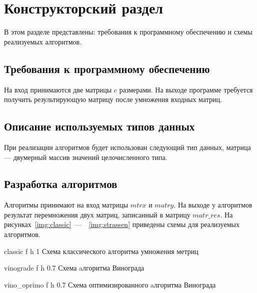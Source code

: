\chapter{Конструкторский раздел}

В этом разделе представлены: требования к программному обеспечению и схемы реализуемых алгоритмов.


\section{Требования к программному обеспечению}

На вход принимаются две матрицы c размерами.
На выходе программе требуется получить результирующую матрицу после умножения входных матриц.

\section{Описание используемых типов данных}
При реализации алгоритмов будет использован следующий тип данных, матрица --- двумерный массив значений целочисленного типа.

\section{Разработка алгоритмов}

Алгоритмы принимают на вход матрицы $mtrx$ и $matry$.
На выходе у алгоритмов результат перемножения двух матриц, записанный в матрицу $matr\_res$.
На рисунках~\ref{img:classic}~---~~\ref{img:strassen} приведены схемы для реализуемых алгоритмов.
	
	{classic} %
	{f} %
	{h} %
	{1\textwidth} %
	{Схема классического алгоритма умножения метриц} %
	\clearpage

	{vinograde} %
	{f} %
	{h} %
	{0.7\textwidth} %
	{Схема aлгоритма Винограда} %
	\clearpage

	{vino_oprimo} %
	{f} %
	{h} %
	{0.7\textwidth} %
	{Схема оптимизированного aлгоритма Винограда} %
	\clearpage

